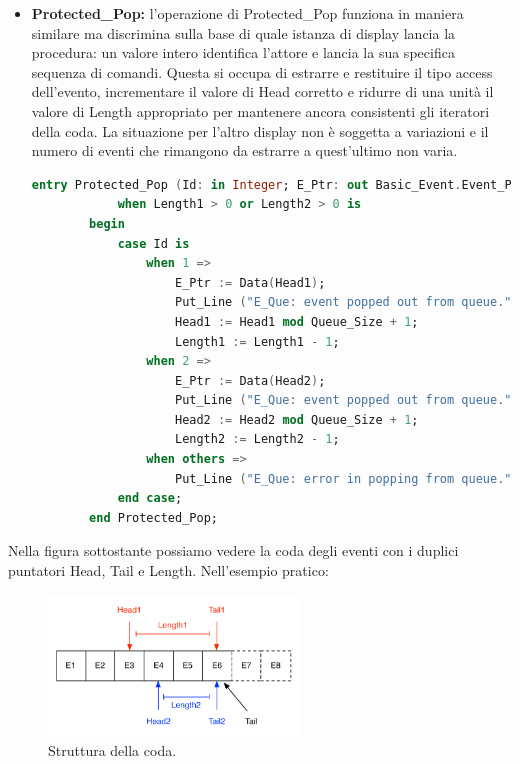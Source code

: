 \documentclass[aps,letterpaper,10pt]{article}
\begin{document}
\begin{itemize}
		\begin{lstlisting}[language=Ada]
		entry Protected_Push (E_Ptr: in Basic_Event.Event_Ptr) 
			when Length1 < Queue_Size and Length2 < Queue_Size is
		begin
	        Data(Tail) := E_Ptr;
	        Tail := Tail mod Queue_Size + 1;
	        Tail1 := Tail1 mod Queue_Size + 1;
	        Tail2 := Tail2 mod Queue_Size + 1;
	        Length1 := Length1 + 1;
	        Length2 := Length2 + 1;
		end Protected_Push;
		\end{lstlisting}	

\item \textbf{Protected\_Pop:} l'operazione di Protected\_Pop funziona in maniera similare ma discrimina sulla base di
quale istanza di display lancia la procedura: un valore intero identifica l'attore e lancia la sua specifica sequenza di
comandi. Questa si occupa di estrarre e restituire il tipo access dell'evento, incrementare il valore di Head corretto e
ridurre di una unit\`a il valore di Length appropriato per mantenere ancora consistenti gli iteratori della coda. La
situazione per l'altro display non \`e soggetta a variazioni e il numero di eventi che rimangono da estrarre a
quest'ultimo non varia.
	
		\begin{lstlisting}[language=Ada]
		entry Protected_Pop (Id: in Integer; E_Ptr: out Basic_Event.Event_Ptr) 
			when Length1 > 0 or Length2 > 0 is
		begin
			case Id is
				when 1 => 
					E_Ptr := Data(Head1);
					Put_Line ("E_Que: event popped out from queue.");
			        Head1 := Head1 mod Queue_Size + 1;
			        Length1 := Length1 - 1;
				when 2 =>
					E_Ptr := Data(Head2);
					Put_Line ("E_Que: event popped out from queue.");
			        Head2 := Head2 mod Queue_Size + 1;
			        Length2 := Length2 - 1;
				when others =>
					Put_Line ("E_Que: error in popping from queue.");
			end case;
		end Protected_Pop;
		\end{lstlisting}	
\end{itemize}

Nella figura sottostante possiamo vedere la coda degli eventi con i duplici puntatori Head, Tail e Length. Nell'esempio
pratico:

\begin{figure}[H]
	\begin{center}
		\includegraphics[width=250px]{images/queue-struct.pdf}
	\end{center}
	\caption{Struttura della coda.}
\end{figure}
\end{document}
